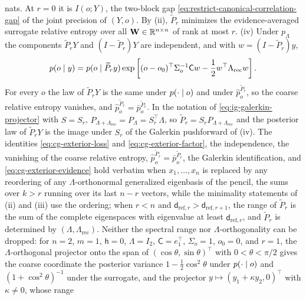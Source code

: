 nats. At \(r=0\) it is \(I(o;Y)\), the two-block gap
\eqref{eq:restrict-canonical-correlation-gap} of the joint precision of
\((Y,o)\). By (ii), \(\widetilde P_r\) minimizes the evidence-averaged surrogate
relative entropy over all \(\mathbf W\in\mathbb R^{n\times n}\) of rank at most \(r\).
(iv) Under \(p_\Lambda\) the components \(\widetilde P_rY\) and
\((I-\widetilde P_r)Y\) are independent, and with \(w=(I-\widetilde P_r)y\),
\begin{equation}
p(o\mid y)=p(o\mid\widetilde P_ry)
\exp\left[(o-o_0)^\top\Sigma_o^{-1}\mathsf Cw-\frac12w^\top\Lambda_{\mathrm{rec}}w\right].
\label{eq:cg-exterior-factor}
\end{equation}
For every \(o\) the law of \(\widetilde P_rY\) is the same under
\(p(\cdot\mid o)\) and under \(\widehat p^{\widetilde P_r}_o\), so the coarse
relative entropy vanishes, and \(\widehat p^{\widetilde P_r}_o=\bar p^{\widetilde P_r}_o\).
In the notation of \eqref{eq:ig-galerkin-projector} with \(S=S_r\),
\(P_{\Lambda+\Lambda_{\mathrm{rec}}}=P_\Lambda=S_r^\top\Lambda\), so
\(\widetilde P_r=S_rP_{\Lambda+\Lambda_{\mathrm{rec}}}\) and the posterior law of
\(\widetilde P_rY\) is the image under \(S_r\) of the Galerkin pushforward of
(iv). The identities \eqref{eq:cg-exterior-loss} and
\eqref{eq:cg-exterior-factor}, the independence, the vanishing of the coarse relative entropy,
\(\widehat p^{\widetilde P_r}_o=\bar p^{\widetilde P_r}_o\), the Galerkin identification, and
\eqref{eq:cg-exterior-evidence} hold verbatim when \(x_1,\ldots,x_n\) is replaced by any reordering
of any \(\Lambda\)-orthonormal generalized eigenbasis of the pencil, the sums over \(k>r\) running
over its last \(n-r\) vectors, while the minimality statements of (ii) and (iii) use the ordering; when \(r<n\) and
\(\mathsf d_{\mathrm{ref},r}>\mathsf d_{\mathrm{ref},r+1}\), the range of
\(\widetilde P_r\) is the sum of the complete eigenspaces with eigenvalue at least
\(\mathsf d_{\mathrm{ref},r}\), and \(\widetilde P_r\) is determined by
\((\Lambda,\Lambda_{\mathrm{rec}})\). Neither the spectral range nor
\(\Lambda\)-orthogonality can be dropped: for \(n=2\), \(m=1\), \(\mathsf h=0\),
\(\Lambda=I_2\), \(\mathsf C=e_1^\top\), \(\Sigma_o=1\), \(o_0=0\), and \(r=1\), the
\(\Lambda\)-orthogonal projector onto the span of \((\cos\theta,\sin\theta)^\top\)
with \(0<\theta<\pi/2\) gives the coarse coordinate the posterior variance
\(1-\tfrac12\cos^2\theta\) under \(p(\cdot\mid o)\) and
\((1+\cos^2\theta)^{-1}\) under the surrogate, and the projector
\(y\mapsto(y_1+\kappa y_2,0)^\top\) with \(\kappa\neq0\), whose range
